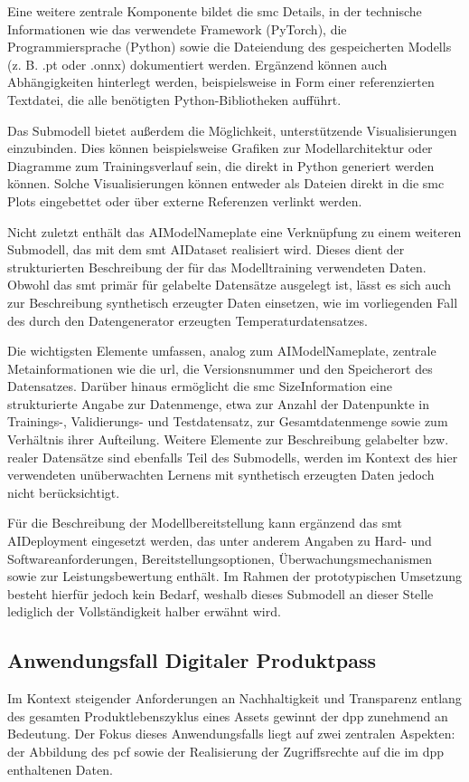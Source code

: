 Eine weitere zentrale Komponente bildet die \acs{smc} Details, in der technische Informationen wie das verwendete Framework (PyTorch), die Programmiersprache (Python) sowie die Dateiendung des gespeicherten Modells (z. B. .pt oder .onnx) dokumentiert werden. 
Ergänzend können auch Abhängigkeiten hinterlegt werden, beispielsweise in Form einer referenzierten Textdatei, die alle benötigten Python-Bibliotheken aufführt.

Das Submodell bietet außerdem die Möglichkeit, unterstützende Visualisierungen einzubinden. 
Dies können beispielsweise Grafiken zur Modellarchitektur oder Diagramme zum Trainingsverlauf sein, die direkt in Python generiert werden können. 
Solche Visualisierungen können entweder als Dateien direkt in die \acs{smc} Plots eingebettet oder über externe Referenzen verlinkt werden.

Nicht zuletzt enthält das AIModelNameplate eine Verknüpfung zu einem weiteren Submodell, das mit dem \acs{smt} AIDataset \cite{SpezifikationAIDataset} realisiert wird.
Dieses dient der strukturierten Beschreibung der für das Modelltraining verwendeten Daten.
Obwohl das \acs{smt} primär für gelabelte Datensätze ausgelegt ist, lässt es sich auch zur Beschreibung synthetisch erzeugter Daten einsetzen, wie im vorliegenden Fall des durch den Datengenerator erzeugten Temperaturdatensatzes.

Die wichtigsten Elemente umfassen, analog zum AIModelNameplate, zentrale Metainformationen wie die \acs{url}, die Versionsnummer und den Speicherort des Datensatzes.
Darüber hinaus ermöglicht die \acs{smc} SizeInformation eine strukturierte Angabe zur Datenmenge, etwa zur Anzahl der Datenpunkte in Trainings-, Validierungs- und Testdatensatz, zur Gesamtdatenmenge sowie zum Verhältnis ihrer Aufteilung.
Weitere Elemente zur Beschreibung gelabelter bzw. realer Datensätze sind ebenfalls Teil des Submodells, werden im Kontext des hier verwendeten unüberwachten Lernens mit synthetisch erzeugten Daten jedoch nicht berücksichtigt.

Für die Beschreibung der Modellbereitstellung kann ergänzend das \acs{smt} AIDeployment \cite{SpezifikationAIDeployement} eingesetzt werden, das unter anderem Angaben zu Hard- und Softwareanforderungen, Bereitstellungsoptionen, Überwachungsmechanismen sowie zur Leistungsbewertung enthält.
Im Rahmen der prototypischen Umsetzung besteht hierfür jedoch kein Bedarf, weshalb dieses Submodell an dieser Stelle lediglich der Vollständigkeit halber erwähnt wird.

\newpage
\subsection{Anwendungsfall Digitaler Produktpass}
Im Kontext steigender Anforderungen an Nachhaltigkeit und Transparenz entlang des gesamten Produktlebenszyklus eines Assets gewinnt der \acs{dpp} zunehmend an Bedeutung. 
Der Fokus dieses Anwendungsfalls liegt auf zwei zentralen Aspekten: der Abbildung des \acs{pcf} sowie der Realisierung der Zugriffsrechte auf die im \acs{dpp} enthaltenen Daten.

